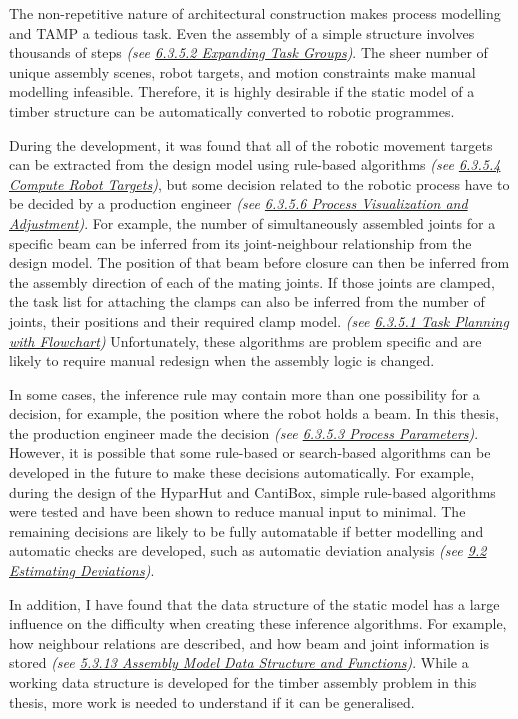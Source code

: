 
The non-repetitive nature of architectural construction makes process modelling and TAMP a tedious task. Even the assembly of a simple structure involves thousands of steps\textit{ (see \uline{6.3.5.2 Expanding Task Groups})}. The sheer number of unique assembly scenes, robot targets, and motion constraints make manual modelling infeasible. Therefore, it is highly desirable if the static model of a timber structure can be automatically converted to robotic programmes.

During the development, it was found that all of the robotic movement targets can be extracted from the design model using rule-based algorithms \textit{(see \uline{6.3.5.4 Compute Robot Targets})}, but some decision related to the robotic process have to be decided by a production engineer \textit{(see \uline{6.3.5.6 Process Visualization and Adjustment})}. For example, the number of simultaneously assembled joints for a specific beam can be inferred from its joint-neighbour relationship from the design model. The position of that beam before closure can then be inferred from the assembly direction of each of the mating joints. If those joints are clamped, the task list for attaching the clamps can also be inferred from the number of joints, their positions and their required clamp model. \textit{(see \uline{6.3.5.1 Task Planning with Flowchart}) }Unfortunately, these algorithms are problem specific and are likely to require manual redesign when the assembly logic is changed. 

In some cases, the inference rule may contain more than one possibility for a decision, for example, the position where the robot holds a beam. In this thesis, the production engineer made the decision \textit{(see \uline{6.3.5.3 Process Parameters})}. However, it is possible that some rule-based or search-based algorithms can be developed in the future to make these decisions automatically. For example, during the design of the HyparHut and CantiBox, simple rule-based algorithms were tested and have been shown to reduce manual input to minimal. The remaining decisions are likely to be fully automatable if better modelling and automatic checks are developed, such as automatic deviation analysis\textit{ (see \uline{9.2 Estimating Deviations})}.

In addition, I have found that the data structure of the static model has a large influence on the difficulty when creating these inference algorithms. For example, how neighbour relations are described, and how beam and joint information is stored \textit{(see \uline{5.3.13 Assembly Model Data Structure and Functions})}. While a working data structure is developed for the timber assembly problem in this thesis, more work is needed to understand if it can be generalised. 

